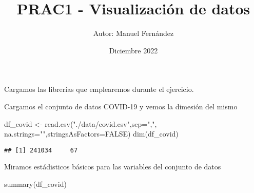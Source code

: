 \documentclass[
]{article}
\title{PRAC1 - Visualización de datos}
\author{Autor: Manuel Fernández}
\date{Diciembre 2022}
\newenvironment{Shaded}{\begin{snugshade}}{\end{snugshade}}
\newcommand{\DataTypeTok}[1]{\textcolor[rgb]{0.87,0.87,0.75}{#1}}
\newcommand{\KeywordTok}[1]{\textcolor[rgb]{0.94,0.87,0.69}{#1}}
\newcommand{\NormalTok}[1]{\textcolor[rgb]{0.80,0.80,0.80}{#1}}
\newcommand{\OtherTok}[1]{\textcolor[rgb]{0.94,0.94,0.56}{#1}}
\newcommand{\StringTok}[1]{\textcolor[rgb]{0.80,0.58,0.58}{#1}}
\begin{document}
\maketitle

{
\setcounter{tocdepth}{2}
\tableofcontents
}
Cargamos las librerías que emplearemos durante el ejercicio.

Cargamos el conjunto de datos COVID-19 y vemos la dimesión del mismo

\begin{Shaded}
\begin{Highlighting}[]
\NormalTok{df_covid <-}\StringTok{ }\KeywordTok{read.csv}\NormalTok{(}\StringTok{"./data/covid.csv"}\NormalTok{,}\DataTypeTok{sep=}\StringTok{","}\NormalTok{, }\DataTypeTok{na.strings=}\StringTok{""}\NormalTok{,}\DataTypeTok{stringsAsFactors=}\OtherTok{FALSE}\NormalTok{)}
\KeywordTok{dim}\NormalTok{(df_covid)}
\end{Highlighting}
\end{Shaded}

\begin{verbatim}
## [1] 241034     67
\end{verbatim}

Miramos estádisticos básicos para las variables del conjunto de datos

\begin{Shaded}
\begin{Highlighting}[]
\KeywordTok{summary}\NormalTok{(df_covid)}
\end{Highlighting}
\end{Shaded}
\end{document}

